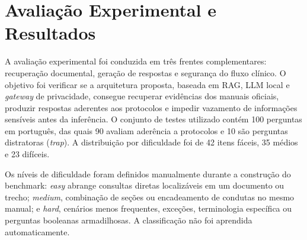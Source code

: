 \documentclass[12pt]{article}
\begin{document}




\section{Avaliação Experimental e Resultados}\label{sec:avaliacao}

A avaliação experimental foi conduzida em três frentes complementares: recuperação documental, geração de respostas e segurança do fluxo clínico. 
O objetivo foi verificar se a arquitetura proposta, baseada em RAG, LLM local e \textit{gateway} de privacidade, consegue recuperar evidências dos manuais oficiais, produzir respostas aderentes aos protocolos e impedir vazamento de informações sensíveis antes da inferência.
O conjunto de testes utilizado contém 100 perguntas em português, das quais 90 avaliam aderência a protocolos e 10 são perguntas distratoras (\textit{trap}).
A distribuição por dificuldade foi de 42 itens fáceis, 35 médios e 23 difíceis.


Os níveis de dificuldade foram definidos manualmente durante a construção do benchmark: \textit{easy} abrange consultas diretas localizáveis em um documento ou trecho; \textit{medium}, combinação de seções ou encadeamento de condutas no mesmo manual; e \textit{hard}, cenários menos frequentes, exceções, terminologia específica ou perguntas booleanas armadilhosas. A classificação não foi aprendida automaticamente.
\end{document}
